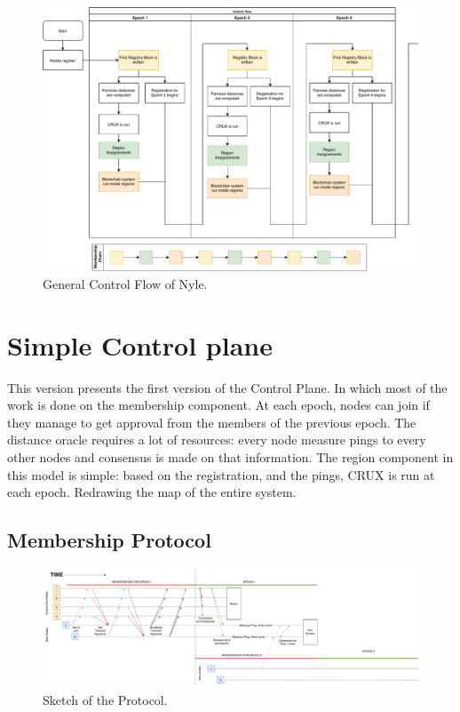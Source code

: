 \documentclass[a4paper,11pt,oneside]{report}
\begin{document}
\begin{figure}[!h] 
\centering
\includegraphics[width=400pt]{figures/Nyle_controlflow}
\caption{General Control Flow of Nyle. }
\label{fig:controlflow}
\end{figure}

\section{Simple Control plane} This version presents the first version of the
Control Plane. In which most of the work is done on the membership component.
At each epoch, nodes can join if they manage to get approval from the members
of the previous epoch. The distance oracle requires a lot of resources: every
node measure pings to every other nodes and consensus is made on that
information. The region component in this model is simple: based on the
registration, and the pings, CRUX is run at each epoch. Redrawing the map of
the entire system. 

\subsection{Membership Protocol}

\begin{figure}
\centering
\includegraphics[width=700pt]{figures/Registrationprotocol}
\caption{Sketch of the Protocol.}
\label{fig:registrationprotocol}
\end{figure}
\end{document}
